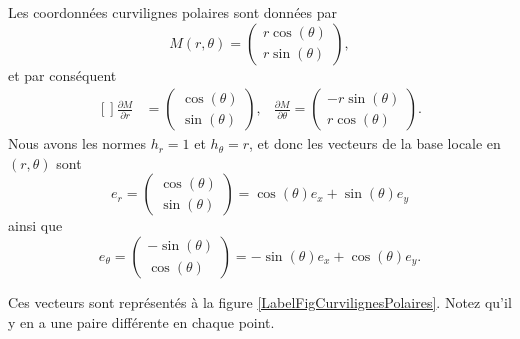 Les coordonnées curvilignes polaires sont données par
\begin{equation}
    M(r,\theta)=\begin{pmatrix}
        r\cos(\theta)    \\ 
        r\sin(\theta)    
    \end{pmatrix},
\end{equation}
et par conséquent
\begin{equation}
    \begin{aligned}[]
        \frac{ \partial M }{ \partial r }&=\begin{pmatrix}
            \cos(\theta)    \\ 
            \sin(\theta)    
        \end{pmatrix},&\frac{ \partial M }{ \partial \theta }=\begin{pmatrix}
            -r\sin(\theta)    \\ 
            r\cos(\theta)    
        \end{pmatrix}.
    \end{aligned}
\end{equation}
Nous avons les normes $h_r=1$ et $h_{\theta}=r$, et donc les vecteurs de la base locale en $(r,\theta)$ sont
\begin{equation}
    e_r=\begin{pmatrix}
        \cos(\theta)    \\ 
        \sin(\theta)    
    \end{pmatrix}=\cos(\theta)e_x+\sin(\theta)e_y
\end{equation}
ainsi que
\begin{equation}
    e_{\theta}=\begin{pmatrix}
        -\sin(\theta)    \\ 
        \cos(\theta)    
    \end{pmatrix}=-\sin(\theta)e_x+\cos(\theta)e_y.
\end{equation}


Ces vecteurs sont représentés à la figure \ref{LabelFigCurvilignesPolaires}. Notez qu'il y en a une paire différente en chaque point.
\newcommand{\CaptionFigCurvilignesPolaires}{En brun, les lignes que le point suivrait si on ne variait qu'une coordonnées polaire à la fois. Les vecteurs rouges sont les vecteurs $e_{r}$ et $e_{\theta}$.}



